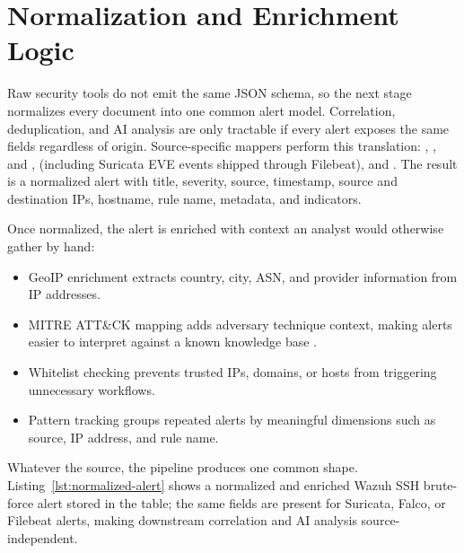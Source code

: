 
\section{Normalization and Enrichment Logic}

Raw security tools do not emit the same JSON schema, so the next stage normalizes every document into one common alert model. Correlation, deduplication, and AI analysis are only tractable if every alert exposes the same fields regardless of origin. Source-specific mappers perform this translation: , ,  and ,  (including Suricata EVE events shipped through Filebeat), and . The result is a normalized alert with title, severity, source, timestamp, source and destination IPs, hostname, rule name, metadata, and indicators.

Once normalized, the alert is enriched with context an analyst would otherwise gather by hand:

\begin{itemize}[leftmargin=1cm]
\item GeoIP enrichment extracts country, city, ASN, and provider information from IP addresses.
\item MITRE ATT\&CK mapping adds adversary technique context, making alerts easier to interpret against a known knowledge base \cite{mitre_attack}.
\item Whitelist checking prevents trusted IPs, domains, or hosts from triggering unnecessary workflows.
\item Pattern tracking groups repeated alerts by meaningful dimensions such as source, IP address, and rule name.
\end{itemize}


Whatever the source, the pipeline produces one common shape. Listing~\ref{lst:normalized-alert} shows a normalized and enriched Wazuh SSH brute-force alert stored in the  table; the same fields are present for Suricata, Falco, or Filebeat alerts, making downstream correlation and AI analysis source-independent.

